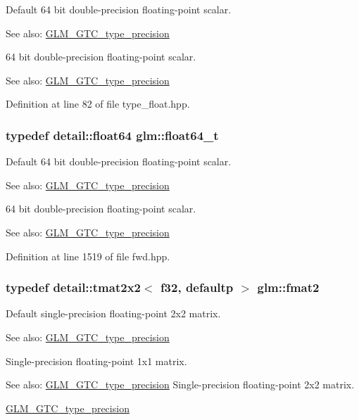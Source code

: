 Default 64 bit double-precision floating-point scalar. \begin{Desc}
\item[See also:]\hyperlink{group__gtc__type__precision}{GLM\_\-GTC\_\-type\_\-precision}\end{Desc}
64 bit double-precision floating-point scalar. \begin{Desc}
\item[See also:]\hyperlink{group__gtc__type__precision}{GLM\_\-GTC\_\-type\_\-precision} \end{Desc}


Definition at line 82 of file type\_\-float.hpp.\hypertarget{group__gtc__type__precision_gde966a3eb25ebeb16dd53c40d3fdeb46}{
\subsubsection[float64\_\-t]{\setlength{\rightskip}{0pt plus 5cm}typedef detail::float64 {\bf glm::float64\_\-t}}}
\label{group__gtc__type__precision_gde966a3eb25ebeb16dd53c40d3fdeb46}


Default 64 bit double-precision floating-point scalar. \begin{Desc}
\item[See also:]\hyperlink{group__gtc__type__precision}{GLM\_\-GTC\_\-type\_\-precision}\end{Desc}
64 bit double-precision floating-point scalar. \begin{Desc}
\item[See also:]\hyperlink{group__gtc__type__precision}{GLM\_\-GTC\_\-type\_\-precision} \end{Desc}


Definition at line 1519 of file fwd.hpp.\hypertarget{group__gtc__type__precision_g96b15c5eaecce87b352dab5d373da979}{
\subsubsection[fmat2]{\setlength{\rightskip}{0pt plus 5cm}typedef detail::tmat2x2$<$ f32, defaultp $>$ {\bf glm::fmat2}}}
\label{group__gtc__type__precision_g96b15c5eaecce87b352dab5d373da979}


Default single-precision floating-point 2x2 matrix. \begin{Desc}
\item[See also:]\hyperlink{group__gtc__type__precision}{GLM\_\-GTC\_\-type\_\-precision}\end{Desc}
Single-precision floating-point 1x1 matrix. \begin{Desc}
\item[See also:]\hyperlink{group__gtc__type__precision}{GLM\_\-GTC\_\-type\_\-precision} Single-precision floating-point 2x2 matrix. 

\hyperlink{group__gtc__type__precision}{GLM\_\-GTC\_\-type\_\-precision} \end{Desc}


